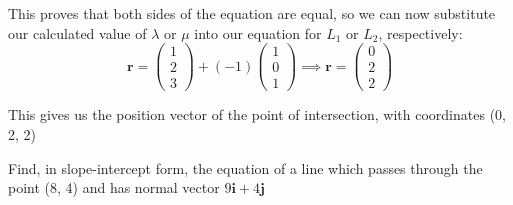 \documentclass[
	11pt, %
	fleqn, %
	a4paper, %
]{../../styles/LegrandOrangeBook}
\begin{document}
\begin{solution}
	This proves that both sides of the equation are equal, so we can now substitute our calculated value of $\lambda$ or $\mu$ into our equation for $L_1$ or $L_2$, respectively:
	\begin{equation*}
		\mathbf{r} = \begin{pmatrix}
			1 \\ 2 \\ 3
		\end{pmatrix} + (-1) \begin{pmatrix}
			1 \\ 0 \\ 1
		\end{pmatrix} \implies \mathbf{r} = \begin{pmatrix}
			0 \\ 2 \\ 2
		\end{pmatrix}
	\end{equation*}
	
	This gives us the position vector of the point of intersection, with coordinates (0, 2, 2)
\end{solution}

\newpage

\begin{problem}
	Find, in slope-intercept form, the equation of a line which passes through the point (8, 4) and has normal vector $9\mathbf{i} + 4\mathbf{j}$
\end{problem}
\end{document}
